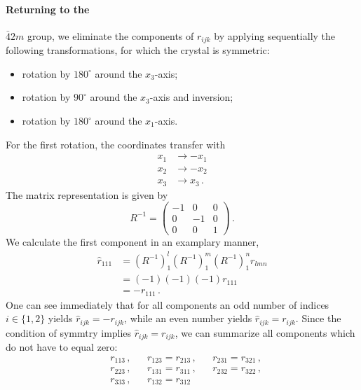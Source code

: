 \paragraph{Returning to the} $\bar{4}2m$ group, 
we eliminate the components of $r_{ijk}$ by applying sequentially 
the following transformations, for which the crystal is symmetric:
\begin{itemize}
    \item
    rotation by $180^\circ$ around the $x_3$-axis;
    \item
    rotation by $90^\circ$ around the $x_3$-axis and inversion;
    \item
    rotation by $180^\circ$ around the $x_1$-axis. 
\end{itemize}
For the first rotation, the coordinates transfer with 
\begin{equation}
    \begin{split}
    x_1 &\rightarrow -x_1 \\
    x_2 &\rightarrow -x_2 \\
    x_3 &\rightarrow x_3  \, .
    \end{split}
\end{equation}
The matrix representation is given by
\begin{equation}
    R^{-1} = 
    \begin{pmatrix}
    -1 &  0 &  0 \\
     0 & -1 &  0 \\
     0 &  0 &  1 
    \end{pmatrix} \, .
\end{equation}
We calculate the first component in an examplary manner, 
\begin{equation}
    \begin{split}
    \hat{r}_{111} &= 
        \left( R^{-1}\right)_1^l
        \left( R^{-1}\right)_1^m
        \left( R^{-1}\right)_1^n
        r_{lmn}  \\
        &= (-1)(-1)(-1)r_{111} \\
        &= -r_{111} \, .
    \end{split}
\end{equation}
One can see immediately that for all components an odd number 
of indices $i \in \{1, 2\}$ yields $\hat{r}_{ijk} = -r_{ijk}$, 
while an even number yields $\hat{r}_{ijk} = r_{ijk}$. 
Since the condition of symmtry implies $\hat{r}_{ijk} = r_{ijk}$, 
we can summarize all components which do not have to equal zero:
\begin{align}
    &{r}_{113}\, ,& 
    &{r}_{123} = {r}_{213}\, , &
    &{r}_{231} = {r}_{321}\, , \nonumber \\ 
    &{r}_{223}\, ,& 
    &{r}_{131} = {r}_{311}\, , & 
    &{r}_{232} = {r}_{322}\, , \nonumber \\ 
    &{r}_{333}\, ,& 
    &{r}_{132} = {r}_{312}
\end{align}

